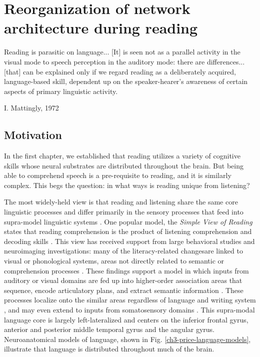 \chapter{Reorganization of network architecture during reading}

\epigraph{Reading is parasitic on language... [It] is seen not as a parallel activity in the visual mode to speech perception in the auditory mode: there are differences... [that] can be explained only if we regard reading as a deliberately acquired, language-based skill, dependent up on the speaker-hearer's awareness of certain aspects of primary linguistic activity.}{I. Mattingly, 1972 \citep{Mattingly1971}}

\section{Motivation}

In the first chapter, we established that reading utilizes a variety of cognitive skills whose neural substrates are distributed throughout the brain. But being able to comprehend speech is a pre-requisite to reading, and it is similarly complex. This begs the question: in what ways is reading unique from listening?

The most widely-held view is that reading and listening share the same core linguistic processes and differ primarily in the sensory processes that feed into supra-model linguistic systems \citep{Mattingly1971, Price2012}. One popular model, the \textit{Simple View of Reading} states that reading comprehension is the product of listening comprehension and decoding skills \citep{Gough1986}. This view has received support from large behavioral studies \citep{Kirby2008} and neuroimaging investigations: many of the literacy-related changesare linked to visual or phonological systems, areas not directly related to semantic or comprehension processes \citep{Schlaggar2007, Dehaene2015}. These findings support a model in which inputs from auditory or visual domains are fed up into higher-order association areas that sequence, encode articulatory plans, and extract semantic information \citep{Price2012}. These processes localize onto the similar areas regardless of language and writing system \citep{Rueckl2016}, and may even extend to inputs from somatosensory domains \citep{Xu2005, Sood2016}. This supra-modal language core is largely left-lateralized and centers on the inferior frontal gyrus, anterior and posterior middle temporal gyrus and the angular gyrus. Neuroanatomical models of language, shown in Fig. \ref{ch3-price-language-models}, illustrate that language is distributed throughout much of the brain. 

